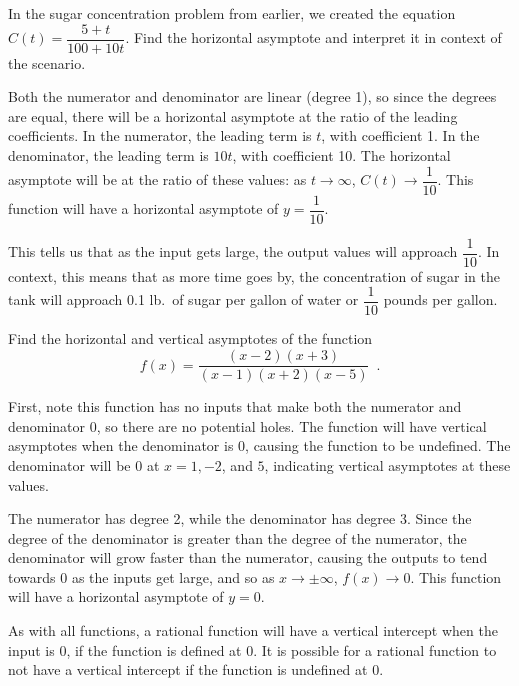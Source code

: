 \begin{example}
In the sugar concentration problem from earlier, we created the equation $C(t)=\dfrac{5+t}{100+10t}$. Find the horizontal asymptote and interpret it in context of the scenario.

\begin{solution} Both the numerator and denominator are linear (degree 1), so since the degrees are equal, there will be a horizontal asymptote at the ratio of the leading coefficients. In the numerator, the leading term is $t$, with coefficient 1. In the denominator, the leading term is $10t$, with coefficient 10. The horizontal asymptote will be at the ratio of these values: as $t\to\infty$, $C(t)\to \dfrac{1}{10}$. This function will have a horizontal asymptote of $y=\dfrac{1}{10}$.

This tells us that as the input gets large, the output values will approach $\dfrac{1}{10}$. In context, this means that as more time goes by, the concentration of sugar in the tank will approach 0.1 lb.\ of sugar per gallon of water or $\dfrac{1}{10}$ pounds per gallon.
\end{solution}\end{example}
\begin{example}
Find the horizontal and vertical asymptotes of the function
$$f(x) = \dfrac{(x-2)(x+3)}{(x-1)(x+2)(x-5)} \enspace.$$

\begin{solution} First, note this function has no inputs that make both the numerator and denominator 0, so there are no potential holes. The function will have vertical asymptotes when the denominator is 0, causing the function to be undefined. The denominator will be 0 at $x= 1, -2$, and $5$, indicating vertical asymptotes at these values.

The numerator has degree 2, while the denominator has degree 3. Since the degree of the denominator is greater than the degree of the numerator, the denominator will grow faster than the numerator, causing the outputs to tend towards 0 as the inputs get large, and so as $x\to\pm\infty$, $f(x)\to 0$. This function will have a horizontal asymptote of $y=0$.
\end{solution}\end{example}

As with all functions, a rational function will have a vertical intercept when the input is 0, if the function is defined at 0. It is possible for a rational function to not have a vertical intercept if the function is undefined at 0.

